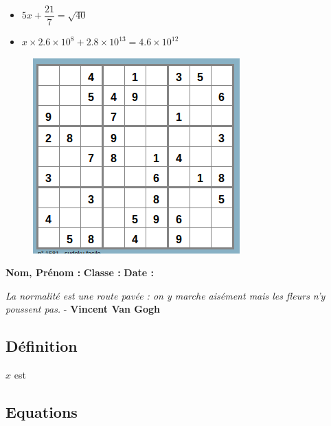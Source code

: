 \begin{multicols}{2}
  \begin{itemize}[label={$\bullet$}]
\item $5x + \dfrac{21}{7} = \sqrt{40}$ \\ \Pointilles[10]  \columnbreak 
\item $x \times 2.6 \times 10^{8} +  2.8 \times 10^{13} = 4.6 \times 10^{12}$ \\ \Pointilles[10]
\end{itemize} 
\end{multicols}

\begin{figure}[H]
  \centering
  \includegraphics[width=0.6\linewidth]{4x6-equations/sudoku-9a.png}
\end{figure}

\newpage


\textbf{Nom, Prénom :} \hspace{8cm} \textbf{Classe :} \hspace{3cm} \textbf{Date :}\\
\vspace{-0.8cm}
\begin{center}
  \textit{La normalité est une route pavée : on y marche aisément mais les fleurs n’y poussent pas.} - \textbf{Vincent Van Gogh}
\end{center}
\vspace{-0.8cm}

\subsection*{Définition}

$x$ est \dotfill \\ \Pointilles[1]

\subsection*{Equations}


